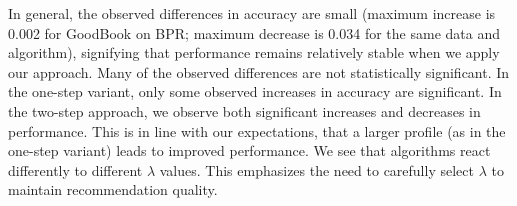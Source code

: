 \documentclass[runningheads]{llncs}
\begin{document}
In general, the observed differences in accuracy are small (maximum increase is 0.002 for GoodBook on BPR; maximum decrease is 0.034 for the same data and algorithm), signifying that performance remains relatively stable when we apply our approach. Many of the observed differences are not statistically significant. In the one-step variant, only some observed increases in accuracy are significant. In the two-step approach, we observe both significant increases and decreases in performance. This is in line with our expectations, that a larger profile (as in the one-step variant) leads to improved performance. We see that algorithms react differently to different $\lambda$ values. This emphasizes the need to carefully select $\lambda$ to maintain recommendation quality.  


\begin{table}[htb]
\centering
\caption{Recommendation performance for the GoodBook Data. 
We emphasize the recommendations with the highest scores across conditions (original vs pre-processed data). Statistical significance is indicated by $^*$, based on paired t-tests comparing $\lambda$ values to the baseline ($\lambda = 0$). Standard deviation is denoted by $\pm$.}


\end{table}
\end{document}
